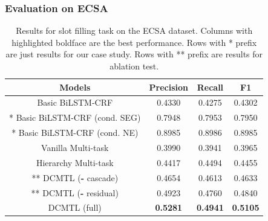 \subsubsection{Evaluation on ECSA}
\begin{table}[th]
	\centering
	\scriptsize
	\begin{tabular}{c|ccc}
		\toprule
		Models & Precision & Recall & F1 \\
		\midrule
		Basic BiLSTM-CRF & 0.4330 & 0.4275 & 0.4302 \\
		* Basic BiLSTM-CRF (cond. SEG) & 0.7948 & 0.7953 & 0.7950 \\
		* Basic BiLSTM-CRF (cond. NE) & 0.8985 & 0.8986 & 0.8985 \\
		\midrule
		Vanilla Multi-task & 0.3990 & 0.3941 & 0.3965 \\
		Hierarchy Multi-task & 0.4417 & 0.4494 & 0.4455 \\
		\midrule
		** DCMTL (\textbf{-} cascade) & 0.4654  & 0.4613 & 0.4633  \\
		** DCMTL (\textbf{-} residual) & 0.4923 & 0.4760 & 0.4840  \\
		DCMTL (full) & \textbf{0.5281} & \textbf{0.4941} & \textbf{0.5105} \\
		\bottomrule
	\end{tabular}
	\caption{Results for slot filling task on the ECSA dataset.
		Columns with highlighted boldface are the best performance.
		Rows with * prefix are just results for our case study.
		Rows with ** prefix are results for ablation test.}
	\label{tab:eval_ECSGA}
\end{table}

